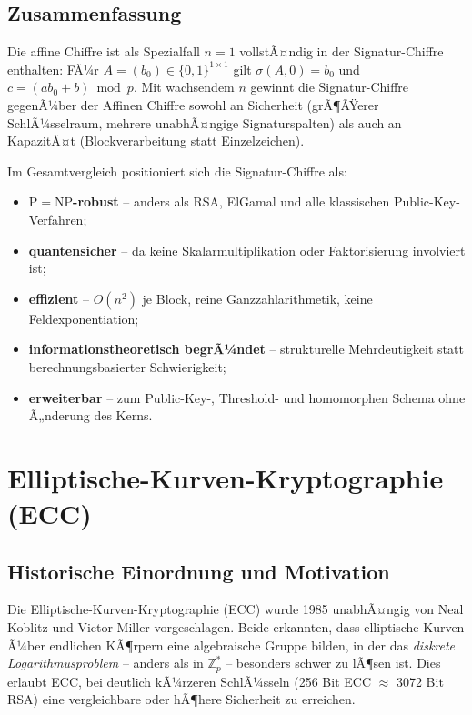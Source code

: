 ﻿\documentclass[a4paper,12pt]{scrreprt}
\theoremstyle{definition}
\begin{document}
\subsection{Zusammenfassung}

Die affine Chiffre \cite{Epp26c} ist als Spezialfall $n=1$ vollstÃ¤ndig in der Signatur-Chiffre enthalten: FÃ¼r $A=(b_0)\in\{0,1\}^{1\times1}$ gilt $\sigma(A,0)=b_0$ und $c=(ab_0+b)\bmod p$. Mit wachsendem $n$ gewinnt die Signatur-Chiffre gegenÃ¼ber der Affinen Chiffre sowohl an Sicherheit (grÃ¶ÃŸerer SchlÃ¼sselraum, mehrere unabhÃ¤ngige Signaturspalten) als auch an KapazitÃ¤t (Blockverarbeitung statt Einzelzeichen).

Im Gesamtvergleich positioniert sich die Signatur-Chiffre als:
\begin{itemize}
  \item \textbf{$\mathrm{P}=\mathrm{NP}$-robust} -- anders als RSA, ElGamal und alle klassischen Public-Key-Verfahren;
  \item \textbf{quantensicher} -- da keine Skalarmultiplikation oder Faktorisierung involviert ist;
  \item \textbf{effizient} -- $O(n^2)$ je Block, reine Ganzzahlarithmetik, keine Feldexponentiation;
  \item \textbf{informationstheoretisch begrÃ¼ndet} -- strukturelle Mehrdeutigkeit statt berechnungsbasierter Schwierigkeit;
  \item \textbf{erweiterbar} -- zum Public-Key-, Threshold- und homomorphen Schema ohne Ã„nderung des Kerns.
\end{itemize}

\section{Elliptische-Kurven-Kryptographie (ECC)}

\subsection{Historische Einordnung und Motivation}

Die Elliptische-Kurven-Kryptographie (ECC) wurde 1985 unabhÃ¤ngig von Neal Koblitz \cite{Kob87} und Victor Miller \cite{Mil86} vorgeschlagen. Beide erkannten, dass elliptische Kurven Ã¼ber endlichen KÃ¶rpern eine algebraische Gruppe bilden, in der das \emph{diskrete Logarithmusproblem} -- anders als in $\mathbb{Z}_p^*$ -- besonders schwer zu lÃ¶sen ist. Dies erlaubt ECC, bei deutlich kÃ¼rzeren SchlÃ¼sseln (256 Bit ECC $\approx$ 3072 Bit RSA) eine vergleichbare oder hÃ¶here Sicherheit zu erreichen.
\end{document}
